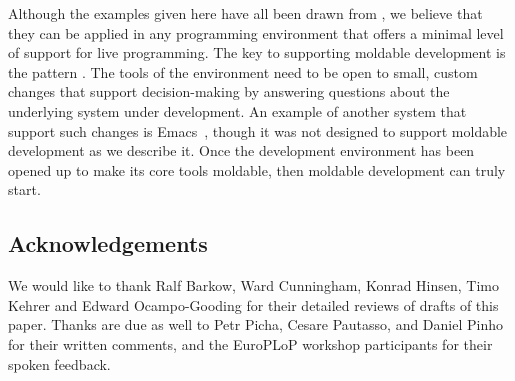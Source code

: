 \documentclass[acmsmall,screen,authorversion,nonacm]{acmart} %
\newcommand{\GT}{\lst{GT}\xspace} %
\newcommand{\patref}[1]{\emph{\nameref{pat:#1}}\xspace}
\begin{document}
Although the examples given here have all been drawn from \GT, we believe that they can be applied in any programming environment that offers a minimal level of support for live programming.
The key to supporting moldable development is the pattern \patref{MoldableTool}.
The tools of the environment need to be open to small, custom changes that support decision-making by answering questions about the underlying system under development.
An example of another system that support such changes is Emacs~\cite{Stal81a}, though it was not designed to support moldable development as we describe it.
Once the development environment has been opened up to make its core tools moldable, then moldable development can truly start.

\subsection*{Acknowledgements}
We would like to thank Ralf Barkow, Ward Cunningham, Konrad Hinsen, Timo Kehrer and Edward Ocampo-Gooding for their detailed reviews of drafts of this paper.
Thanks are due as well to Petr Picha, Cesare Pautasso, and Daniel Pinho for their written comments, and the EuroPLoP workshop participants for their spoken feedback.



\end{document}
